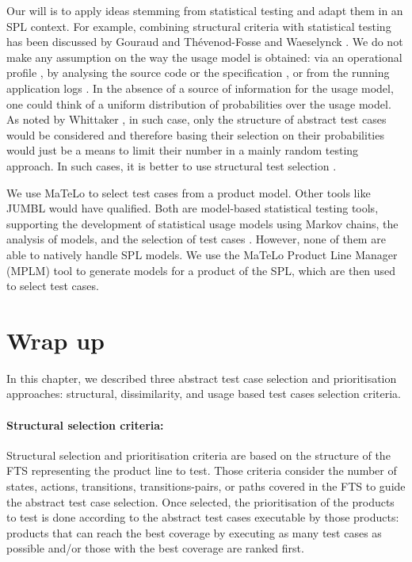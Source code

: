 Our will is to apply ideas stemming from statistical testing \cite{Sprenkle2013} and adapt them in an SPL context. For example, combining structural criteria with statistical testing has been discussed by Gouraud \etal  \cite{Gouraud2001} and Th\'evenod-Fosse and Waeselynck \cite{Thevenod-Fosse1991}. We do not make any assumption on the way the usage model is obtained: via an operational profile \cite{Musa1996}, by analysing the source code or the specification \cite{Thevenod-Fosse1991}, or from the running application logs \cite{Ghezzi2014,Sprenkle2013}. In the absence of a source of information for the usage model, one could think of a uniform distribution of probabilities over the usage model. As noted by Whittaker \cite{Whittaker1994}, in such case, only the structure of abstract test cases would be considered and therefore basing their selection on their probabilities would just be a means to limit their number in a mainly random testing approach. In such cases, it is better to use structural test selection  \cite{Feliachi2010}.

We use MaTeLo \cite{matelo} to select test cases from a product model. Other tools like JUMBL \cite{Prowell2003} would have qualified. Both are model-based statistical testing tools, supporting the development of statistical usage models using Markov chains, the analysis of models, and the selection of test cases \cite{Utting2012}. However, none of them are able to natively handle SPL models. We use the MaTeLo Product Line Manager (MPLM) tool \cite{Samih2014,Samih2014b} to generate models for a product of the SPL, which are then used to select test cases. 


\section{Wrap up}

In this chapter, we described three abstract test case selection and prioritisation approaches: structural, dissimilarity, and usage based test cases selection criteria. 

\paragraph{Structural selection criteria:}

Structural selection and prioritisation criteria are based on the structure of the \gls{FTS} representing the product line to test. Those criteria consider the number of states, actions, transitions, transitions-pairs, or paths covered in the FTS to guide the abstract test case selection. Once selected, the prioritisation of the products to test is done according to the abstract test cases executable by those products: products that can reach the best coverage by executing as many test cases as possible and/or those with the best coverage are ranked first. 


